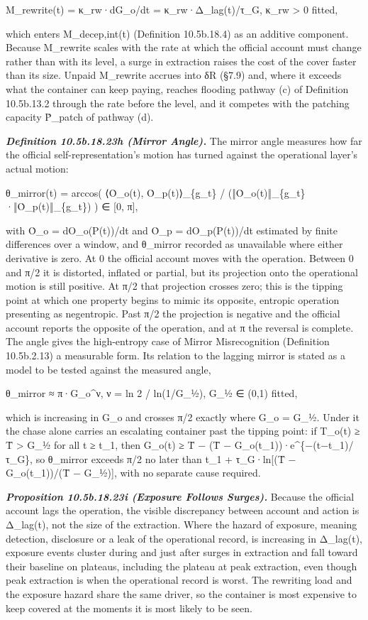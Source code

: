 \documentclass[
]{article}
\begin{document}
M\_rewrite(t) = κ\_rw·\textbar dG\_o/dt\textbar{} =
κ\_rw·\textbar Δ\_lag(t)\textbar/τ\_G, κ\_rw \textgreater{} 0 fitted,

which enters M\_decep,int(t) (Definition 10.5b.18.4) as an additive
component. Because M\_rewrite scales with the rate at which the official
account must change rather than with its level, a surge in extraction
raises the cost of the cover faster than its size. Unpaid M\_rewrite
accrues into δR (§7.9) and, where it exceeds what the container can keep
paying, reaches flooding pathway (c) of Definition 10.5b.13.2 through
the rate before the level, and it competes with the patching capacity
Ṗ\_patch of pathway (d).

\emph{\textbf{Definition 10.5b.18.23h (Mirror Angle).}} The mirror angle
measures how far the official self-representation's motion has turned
against the operational layer's actual motion:

θ\_mirror(t) = arccos( ⟨Ȯ\_o(t), Ȯ\_p(t)⟩\_\{g\_t\} /
(‖Ȯ\_o(t)‖\_\{g\_t\}·‖Ȯ\_p(t)‖\_\{g\_t\}) ) ∈ {[}0, π{]},

with Ȯ\_o = dO\_o(P(t))/dt and Ȯ\_p = dO\_p(P(t))/dt estimated by finite
differences over a window, and θ\_mirror recorded as unavailable where
either derivative is zero. At 0 the official account moves with the
operation. Between 0 and π/2 it is distorted, inflated or partial, but
its projection onto the operational motion is still positive. At π/2
that projection crosses zero; this is the tipping point at which one
property begins to mimic its opposite, entropic operation presenting as
negentropic. Past π/2 the projection is negative and the official
account reports the opposite of the operation, and at π the reversal is
complete. The angle gives the high-entropy case of Mirror Misrecognition
(Definition 10.5b.2.13) a measurable form. Its relation to the lagging
mirror is stated as a model to be tested against the measured angle,

θ\_mirror ≈ π·G\_o\^{}ν, ν = ln 2 / ln(1/G\_½), G\_½ ∈ (0,1) fitted,

which is increasing in G\_o and crosses π/2 exactly where G\_o = G\_½.
Under it the chase alone carries an escalating container past the
tipping point: if T\_o(t) ≥ T̄ \textgreater{} G\_½ for all t ≥ t\_1, then
G\_o(t) ≥ T̄ − (T̄ − G\_o(t\_1))·e\^{}\{−(t−t\_1)/τ\_G\}, so θ\_mirror
exceeds π/2 no later than t\_1 + τ\_G·ln{[}(T̄ − G\_o(t\_1))/(T̄ −
G\_½){]}, with no separate cause required.

\emph{\textbf{Proposition 10.5b.18.23i (Exposure Follows Surges).}}
Because the official account lags the operation, the visible discrepancy
between account and action is Δ\_lag(t), not the size of the extraction.
Where the hazard of exposure, meaning detection, disclosure or a leak of
the operational record, is increasing in \textbar Δ\_lag(t)\textbar,
exposure events cluster during and just after surges in extraction and
fall toward their baseline on plateaus, including the plateau at peak
extraction, even though peak extraction is when the operational record
is worst. The rewriting load and the exposure hazard share the same
driver, so the container is most expensive to keep covered at the
moments it is most likely to be seen.
\end{document}
